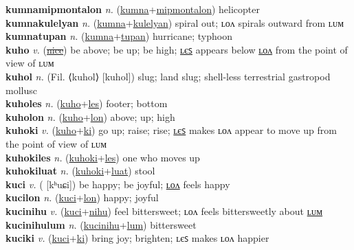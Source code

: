\textbf{kumnamipmontalon} \textit{n.} (\hyperref[kumna]{kumna}+\hyperref[mipmontalon]{mipmontalon})
helicopter \label{kumnamipmontalon} \\
\textbf{kumnakulelyan} \textit{n.} (\hyperref[kumna]{kumna}+\hyperref[kulelyan]{kulelyan})
spiral out; ʟᴏᴧ spirals outward from ʟᴜᴍ \label{kumnakulelyan} \\
\textbf{kumnatupan} \textit{n.} (\hyperref[kumna]{kumna}+\hyperref[tupan]{tupan})
hurricane; typhoon \label{kumnatupan} \\
\textbf{kuho} \textit{v.} (\hyperref[nice]{\sout{nice}})
be above; be up; be high; \hyperref[kuholes]{ʟєꜱ} appears below \hyperref[kuholon]{ʟᴏᴧ} from the point of view of ʟᴜᴍ \label{kuho} \\
\textbf{kuhol} \textit{n.} (Fil. ⟨kuhol⟩ [kuhol])
slug; land slug; shell-less terrestrial gastropod mollusc \label{kuhol} \\
\textbf{kuholes} \textit{n.} (\hyperref[kuho]{kuho}+\hyperref[les]{les})
footer; bottom \label{kuholes} \\
\textbf{kuholon} \textit{n.} (\hyperref[kuho]{kuho}+\hyperref[lon]{lon})
above; up; high \label{kuholon} \\
\textbf{kuhoki} \textit{v.} (\hyperref[kuho]{kuho}+\hyperref[ki]{ki})
go up; raise; rise; \hyperref[kuhokiles]{ʟєꜱ} makes ʟᴏᴧ appear to move up from the point of view of ʟᴜᴍ \label{kuhoki} \\
\textbf{kuhokiles} \textit{n.} (\hyperref[kuhoki]{kuhoki}+\hyperref[les]{les})
one who moves up \label{kuhokiles} \\
\textbf{kuhokiluat} \textit{n.} (\hyperref[kuhoki]{kuhoki}+\hyperref[luat]{luat})
stool \label{kuhokiluat} \\
\textbf{kuci} \textit{v.} ( [kʰuɕi])
be happy; be joyful; \hyperref[kucilon]{ʟᴏᴧ} feels happy \label{kuci} \\
\textbf{kucilon} \textit{n.} (\hyperref[kuci]{kuci}+\hyperref[lon]{lon})
happy; joyful \label{kucilon} \\
\textbf{kucinihu} \textit{v.} (\hyperref[kuci]{kuci}+\hyperref[nihu]{nihu})
feel bittersweet; ʟᴏᴧ feels bittersweetly about \hyperref[kucinihulum]{ʟᴜᴍ} \label{kucinihu} \\
\textbf{kucinihulum} \textit{n.} (\hyperref[kucinihu]{kucinihu}+\hyperref[lum]{lum})
bittersweet \label{kucinihulum} \\
\textbf{kuciki} \textit{v.} (\hyperref[kuci]{kuci}+\hyperref[ki]{ki})
bring joy; brighten; ʟєꜱ makes ʟᴏᴧ happier \label{kuciki} \\

